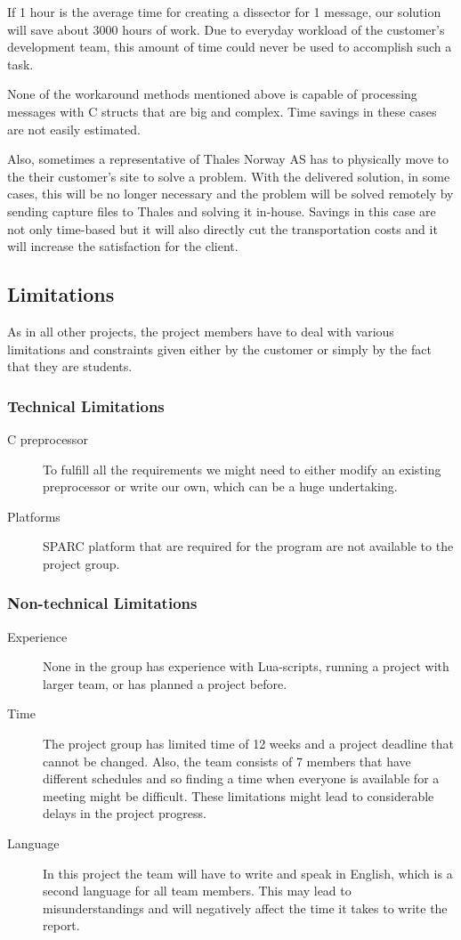 If 1 hour is the average time for creating a dissector for 1 message, our solution will save about 3000 hours of work. Due to everyday workload of the customer’s development team, this amount of time could never be used to accomplish such a task.

None of the workaround methods mentioned above is capable of processing messages with C structs that are big and complex. Time savings in these cases are not easily estimated.

Also, sometimes a representative of Thales Norway AS has to physically move to the their customer’s site to solve a problem. With the delivered solution, in some cases, this will be no longer necessary and the problem will be solved remotely by sending capture files to Thales and solving it in-house. Savings in this case are not only time-based but it will also directly cut the transportation costs and it will increase the satisfaction for the client.

\subsection{Limitations}
As in all other projects, the project members have to deal with various limitations and constraints given either by the customer or simply by the fact that they are students.

\subsubsection{Technical Limitations}
\begin{description}
	\item[C preprocessor] To fulfill all the requirements we might need to
		either modify an existing preprocessor or write our own, which can be
		a huge undertaking.
	\item[Platforms] SPARC platform that are required for the program are not
		available to the project group.
\end{description}

\subsubsection{Non-technical Limitations}
\begin{description}
	\item[Experience] None in the group has experience with Lua-scripts,
		running a project with larger team, or has planned a project before.
	\item[Time] The project group has limited time of 12 weeks and a project
		deadline that cannot be changed. Also, the team consists of 7 members
		that have different schedules and so finding a time when everyone is
		available for a meeting might be difficult. These limitations might
		lead to considerable delays in the project progress.
	\item[Language] In this project the team will have to write and speak in
		English, which is a second language for all team members. This may
		lead to misunderstandings and will negatively affect the time it
		takes to write the report.
\end{description}

